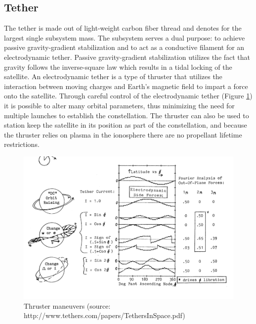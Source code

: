 \documentclass{article}
\begin{document}
\subsection{Tether}
The tether is made out of light-weight carbon fiber thread and denotes for the largest single subsystem mass. The subsystem serves a dual purpose: to achieve passive gravity-gradient stabilization and to act as a conductive filament for an electrodynamic tether. Passive gravity-gradient stabilization utilizes the fact that gravity follows the inverse-square law which results in a tidal locking of the satellite. An electrodynamic tether is a type of thruster that utilizes the interaction between moving charges and Earth's magnetic field to impart a force onto the satellite. Through careful control of the electrodynamic tether (Figure \ref{fig:tether_moves}) it is possible to alter many orbital parameters, thus minimizing the need for multiple launches to establish the constellation. The thruster can also be used to station keep the satellite in its position as part of the constellation, and because the thruster relies on plasma in the ionosphere there are no propellant lifetime restrictions. 
\begin{figure}[H]
  \centering
    \includegraphics[width=\linewidth]{figures/tether_plane_changes}
    \caption{Thruster maneuvers (source: http://www.tethers.com/papers/TethersInSpace.pdf)}
  \label{fig:tether_moves}
\end{figure}
\end{document}
